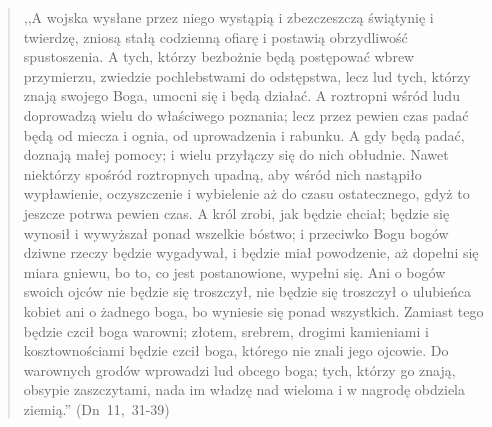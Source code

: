 \documentclass[10pt,a4paper,oneside]{article}
\begin{document}
\begin{quote}
,,A wojska wysłane przez niego wystąpią i zbezczeszczą świątynię i twierdzę, zniosą stałą codzienną ofiarę i postawią obrzydliwość spustoszenia. A tych, którzy bezbożnie będą postępować wbrew przymierzu, zwiedzie pochlebstwami do odstępstwa, lecz lud tych, którzy znają swojego Boga, umocni się i będą działać. A roztropni wśród ludu doprowadzą wielu do właściwego poznania; lecz przez pewien czas padać będą od miecza i ognia, od uprowadzenia i rabunku. A gdy będą padać, doznają małej pomocy; i wielu przyłączy się do nich obłudnie. Nawet niektórzy spośród roztropnych upadną, aby wśród nich nastąpiło wypławienie, oczyszczenie i wybielenie aż do czasu ostatecznego, gdyż to jeszcze potrwa pewien czas. A król zrobi, jak będzie chciał; będzie się wynosił i wywyższał ponad wszelkie bóstwo; i przeciwko Bogu bogów dziwne rzeczy będzie wygadywał, i będzie miał powodzenie, aż dopełni się miara gniewu, bo to, co jest postanowione, wypełni się. Ani o bogów swoich ojców nie będzie się troszczył, nie będzie się troszczył o ulubieńca kobiet ani o żadnego boga, bo wyniesie się ponad wszystkich. Zamiast tego będzie czcił boga warowni; złotem, srebrem, drogimi kamieniami i kosztownościami będzie czcił boga, którego nie znali jego ojcowie. Do warownych grodów wprowadzi lud obcego boga; tych, którzy go znają, obsypie zaszczytami, nada im władzę nad wieloma i w nagrodę obdziela ziemią.'' (Dn~11,~31-39)
\end{quote}
\end{document}
